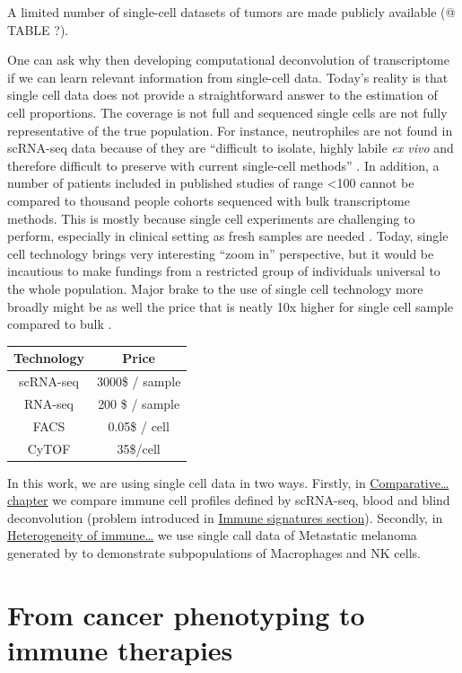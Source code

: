 \documentclass[12pt,]{book}
\theoremstyle{definition}
\theoremstyle{definition}
\theoremstyle{definition}
\theoremstyle{remark}
\begin{document}
A limited number of single-cell datasets of tumors are made publicly
available (@ TABLE ?).

One can ask why then developing computational deconvolution of
transcriptome if we can learn relevant information from single-cell
data. Today's reality is that single cell data does not provide a
straightforward answer to the estimation of cell proportions. The
coverage is not full and sequenced single cells are not fully
representative of the true population. For instance, neutrophiles are
not found in scRNA-seq data because of they are ``difficult to isolate,
highly labile \emph{ex vivo} and therefore difficult to preserve with
current single-cell methods'' \citep{Schelker2017}. In addition, a
number of patients included in published studies of range \textless{}100
cannot be compared to thousand people cohorts sequenced with bulk
transcriptome methods. This is mostly because single cell experiments
are challenging to perform, especially in clinical setting as fresh
samples are needed \citep{Schelker2017}. Today, single cell technology
brings very interesting ``zoom in'' perspective, but it would be
incautious to make fundings from a restricted group of individuals
universal to the whole population. Major brake to the use of single cell
technology more broadly might be as well the price that is neatly 10x
higher for single cell sample compared to bulk \citep{Cedar2018}.

\begin{longtable}[]{@{}cc@{}}
\toprule
Technology & Price\tabularnewline
\midrule
\endhead
scRNA-seq & 3000\$ / sample\tabularnewline
RNA-seq & 200 \$ / sample\tabularnewline
FACS & 0.05\$ / cell\tabularnewline
CyTOF & 35\$/cell\tabularnewline
\bottomrule
\end{longtable}

In this work, we are using single cell data in two ways. Firstly, in
\protect\hyperlink{results}{Comparative\ldots{} chapter} we compare
immune cell profiles defined by scRNA-seq, blood and blind deconvolution
(problem introduced in \protect\hyperlink{immune-signatures}{Immune
signatures section}). Secondly, in \protect\hyperlink{map}{Heterogeneity
of immune\ldots{}} we use single call data of Metastatic melanoma
generated by \citet{Tirosh2016} to demonstrate subpopulations of
Macrophages and NK cells.

\hypertarget{immunotherapies}{%
\section{From cancer phenotyping to immune
therapies}\label{immunotherapies}}
\end{document}
